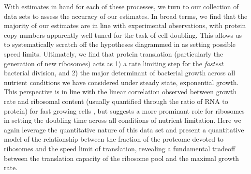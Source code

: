 With estimates in hand for each of these processes, we turn to our collection of
data sets to assess the accuracy of our estimates. In broad terms, we find that
the majority of our estimates are in line with experimental observations, with
protein copy numbers apparently well-tuned for the task of cell doubling. This
allows us to systematically scratch off the hypotheses diagrammed in
 as setting possible speed limits. Ultimately, we find that
protein translation (particularly the generation of new ribosomes) acts as 1) a
rate limiting step for the \textit{fastest} bacterial division, and 2) the major
determinant of bacterial growth across all nutrient conditions we have
considered under steady state, exponential growth. This perspective is in line
with the linear correlation observed between growth rate and ribosomal content
(usually quantified through the ratio of RNA to protein) for fast growing cells
\citep{scott2010}, but suggests a more prominant role for ribosomes in setting
the doubling time across all conditions of nutrient limitation. Here we
again leverage the quantitative nature of this data set and present a
quantitative model of the relationship between the fraction of the proteome
devoted to ribosomes and the speed limit of translation, revealing a fundamental
tradeoff between the translation capacity of the ribosome pool and the maximal
growth rate.


